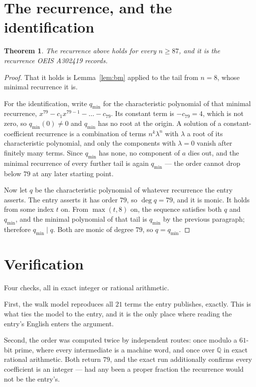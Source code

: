 \documentclass[11pt,a4paper]{article}
\theoremstyle{plain}
\newtheorem{theorem}{Theorem}
\theoremstyle{definition}
\begin{document}
\section{The recurrence, and the identification}

\begin{theorem}
The recurrence above holds for every $n\ge87$, and it is the recurrence OEIS A302419 records.
\end{theorem}

\begin{proof}
That it holds is Lemma~\ref{lem:bm} applied to the tail from $n=8$, whose minimal
recurrence it is.

For the identification, write $q_{\min}$ for the characteristic polynomial of that minimal
recurrence, $x^{79}-c_1x^{79-1}-\dots-c_{79}$. Its constant term is
$-c_{79}=4$, which is not zero, so $q_{\min}(0)\neq0$ and $q_{\min}$ has no
root at the origin. A solution of a constant-coefficient recurrence is a combination of terms
$n^{k}\lambda^{n}$ with $\lambda$ a root of its characteristic polynomial, and only the
components with $\lambda=0$ vanish after finitely many terms. Since $q_{\min}$ has none, no
component of $a$ dies out, and the minimal recurrence of every further tail is again
$q_{\min}$ --- the order cannot drop below $79$ at any later starting point.

Now let $q$ be the characteristic polynomial of whatever recurrence the entry asserts. The
entry asserts it has order $79$, so $\deg q=79$, and it is monic. It holds from some
index $t$ on. From $\max(t,8)$ on, the sequence satisfies both $q$ and $q_{\min}$, and
the minimal polynomial of that tail is $q_{\min}$ by the previous paragraph; therefore
$q_{\min}\mid q$. Both are monic of degree $79$, so $q=q_{\min}$.
\end{proof}

\section{Verification}

Four checks, all in exact integer or rational arithmetic.

First, the walk model reproduces all $21$ terms the entry publishes, exactly. This is
what ties the model to the entry, and it is the only place where reading the entry's English
enters the argument.

Second, the order was computed twice by independent routes: once modulo a $61$-bit prime, where
every intermediate is a machine word, and once over $\mathbb{Q}$ in exact rational arithmetic.
Both return $79$, and the exact run additionally confirms every coefficient is an integer
--- had any been a proper fraction the recurrence would not be the entry's.
\end{document}
